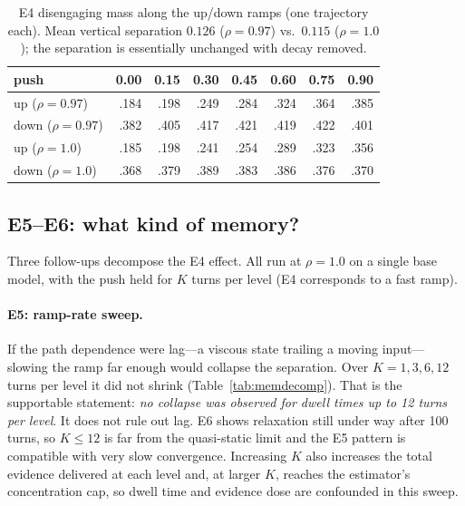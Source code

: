 \documentclass[11pt]{article}
\begin{document}
\begin{table}[t]
\centering
\begin{tabular}{lrrrrrrr}
\toprule
push & 0.00 & 0.15 & 0.30 & 0.45 & 0.60 & 0.75 & 0.90 \\
\midrule
up ($\rho{=}0.97$)   & .184 & .198 & .249 & .284 & .324 & .364 & .385 \\
down ($\rho{=}0.97$) & .382 & .405 & .417 & .421 & .419 & .422 & .401 \\
\midrule
up ($\rho{=}1.0$)    & .185 & .198 & .241 & .254 & .289 & .323 & .356 \\
down ($\rho{=}1.0$)  & .368 & .379 & .389 & .383 & .386 & .376 & .370 \\
\bottomrule
\end{tabular}
\caption{E4 disengaging mass along the up/down ramps (one trajectory each).
Mean vertical separation $0.126$ ($\rho{=}0.97$) vs.\ $0.115$ ($\rho{=}1.0$);
the separation is essentially unchanged with decay removed.}
\label{tab:hyst}
\end{table}

\subsection{E5--E6: what kind of memory?}
Three follow-ups decompose the E4 effect. All run at $\rho=1.0$ on a single
base model, with the push held for $K$ turns per level (E4 corresponds to a
fast ramp).

\paragraph{E5: ramp-rate sweep.} If the path dependence were lag---a viscous
state trailing a moving input---slowing the ramp far enough would collapse the
separation. Over $K=1,3,6,12$ turns per level it did not shrink
(Table~\ref{tab:memdecomp}). That is the supportable statement: \emph{no collapse
was observed for dwell times up to 12 turns per level}. It does not rule out
lag. E6 shows relaxation still under way after 100 turns, so $K\le12$ is far
from the quasi-static limit and the E5 pattern is compatible with very slow
convergence. Increasing $K$ also increases the total evidence delivered at each
level and, at larger $K$, reaches the estimator's concentration cap, so dwell
time and evidence dose are confounded in this sweep.
\end{document}
